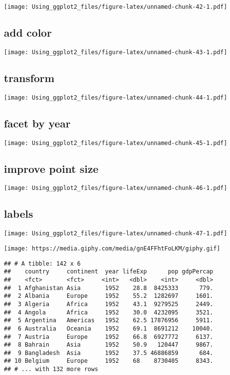 \documentclass[]{article}
\begin{document}
\texttt{[image: Using\_ggplot2\_files/figure-latex/unnamed-chunk-42-1.pdf]}

\hypertarget{add-color}{%
\subsection{add color}\label{add-color}}

\texttt{[image: Using\_ggplot2\_files/figure-latex/unnamed-chunk-43-1.pdf]}

\hypertarget{transform}{%
\subsection{transform}\label{transform}}

\texttt{[image: Using\_ggplot2\_files/figure-latex/unnamed-chunk-44-1.pdf]}

\hypertarget{facet-by-year}{%
\subsection{facet by year}\label{facet-by-year}}

\texttt{[image: Using\_ggplot2\_files/figure-latex/unnamed-chunk-45-1.pdf]}

\hypertarget{improve-point-size}{%
\subsection{improve point size}\label{improve-point-size}}

\texttt{[image: Using\_ggplot2\_files/figure-latex/unnamed-chunk-46-1.pdf]}

\hypertarget{labels}{%
\subsection{labels}\label{labels}}

\texttt{[image: Using\_ggplot2\_files/figure-latex/unnamed-chunk-47-1.pdf]}

\texttt{[image: https://media.giphy.com/media/gnE4FFhtFoLKM/giphy.gif]}

\begin{verbatim}
## # A tibble: 142 x 6
##    country     continent  year lifeExp      pop gdpPercap
##    <fct>       <fct>     <int>   <dbl>    <int>     <dbl>
##  1 Afghanistan Asia       1952    28.8  8425333      779.
##  2 Albania     Europe     1952    55.2  1282697     1601.
##  3 Algeria     Africa     1952    43.1  9279525     2449.
##  4 Angola      Africa     1952    30.0  4232095     3521.
##  5 Argentina   Americas   1952    62.5 17876956     5911.
##  6 Australia   Oceania    1952    69.1  8691212    10040.
##  7 Austria     Europe     1952    66.8  6927772     6137.
##  8 Bahrain     Asia       1952    50.9   120447     9867.
##  9 Bangladesh  Asia       1952    37.5 46886859      684.
## 10 Belgium     Europe     1952    68    8730405     8343.
## # ... with 132 more rows
\end{verbatim}
\end{document}
